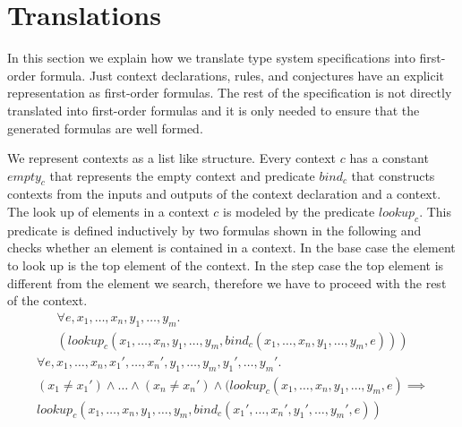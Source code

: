 \section{Translations}
\label{sec:translations}
In this section we explain how we translate type system specifications
into first-order formula. Just context declarations, rules, and
conjectures have an explicit representation as first-order
formulas. The rest of the specification is not directly translated
into first-order formulas and it is only needed to ensure that the
generated formulas are well formed.

We represent contexts as a list like structure. Every context $c$ has
a constant $empty_c$ that represents the empty context and predicate
$bind_c$ that constructs contexts from the inputs and outputs of the
context declaration and a context. The look up of elements in a
context $c$ is modeled by the predicate $lookup_c$. This predicate is
defined inductively by two formulas shown in the following and checks
whether an element is contained in a context. In the base case the
element to look up is the top element of the context. In the step case
the top element is different from the element we search, therefore we
have to proceed with the rest of the context.
\begin{multline}
  \forall e, x_1, \dots, x_n, y_1, \dots, y_m . \\
  (lookup_c(x_1,\dots,x_n,y_1,\dots,y_m,
  bind_c(x_1,\dots,x_n,y_1,\dots,y_m,e)))
\label{formula:context-base}
\end{multline}
\begin{multline}
  \forall e, x_1, \dots, x_n, x_1', \dots, x_n', y_1, \dots, y_m,
  y_1', \dots,
  y_m' . \\
  (x_1 \neq x_1') \land \dots \land (x_n \neq x_n') \land (lookup_c(x_1,
  \dots, x_n, y_1, \dots, y_m, e) \implies \\ lookup_c(x_1, \dots, x_n,
  y_1, \dots, y_m, bind_c(x_1',\dots,x_n',y_1',\dots,y_m',e))
\label{formula:context-step}
\end{multline}

